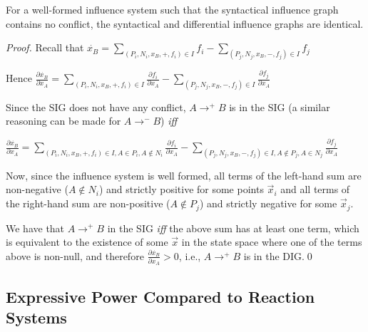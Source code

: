 \documentclass{llncs}
\newcommand{\ra}{\rightarrow}
\begin{document}
\begin{proposition}
For a well-formed influence system
such that the syntactical influence graph contains no conflict,
the syntactical and differential influence graphs are identical.
  \end{proposition}
\begin{proof}

   Recall that $\dot{x_B} = \sum_{(P_i, N_i, x_B, +, f_i) \in I}f_i -
   \sum_{(P_j, N_j, x_B, -, f_j) \in I}f_j$

   Hence $\frac{\partial \dot{x_B}}{\partial x_A} = \sum_{(P_i, N_i,
   x_B, +, f_i) \in I}\frac{\partial f_i}{\partial x_A} - \sum_{(P_j, N_j,
   x_B, -, f_j) \in I}\frac{\partial f_j}{\partial x_A}$

   Since the SIG does not have any conflict, $A\ra^+B$ is in the SIG (a
   similar reasoning can be made for $A\ra^-B$) \emph{iff}

   $%
      \frac{\partial \dot{x_B}}{\partial x_A} = \sum_{(P_i, N_i, x_B, +, f_i)
      \in I, A\in P_i, A\not\in N_i}\frac{\partial f_i}{\partial x_A} - \sum_{(P_j,
      N_j, x_B, -, f_j) \in I, A\not\in P_j, A\in N_j}\frac{\partial f_j}{\partial x_A}
   $%

   Now, since the influence system is well formed, all terms of the left-hand
   sum are non-negative ($A\not\in N_i$) and strictly positive for some points
   $\vec x_i$ and all terms of the right-hand sum are non-positive ($A\not\in
   P_j$) and strictly negative for some $\vec x_j$.

   We have that $A\ra^+B$ in the SIG \emph{iff} the above sum has at least one
   term, which is equivalent to the existence of some $\vec x$ in the state
   space where one of the terms above is non-null, and therefore
   $\frac{\partial \dot{x_B}}{\partial x_A} >0$, i.e., $A\ra^+B$ is in the
   DIG.\qed

\end{proof}

\subsection{Expressive Power Compared to Reaction Systems}\label{express}
\end{document}
